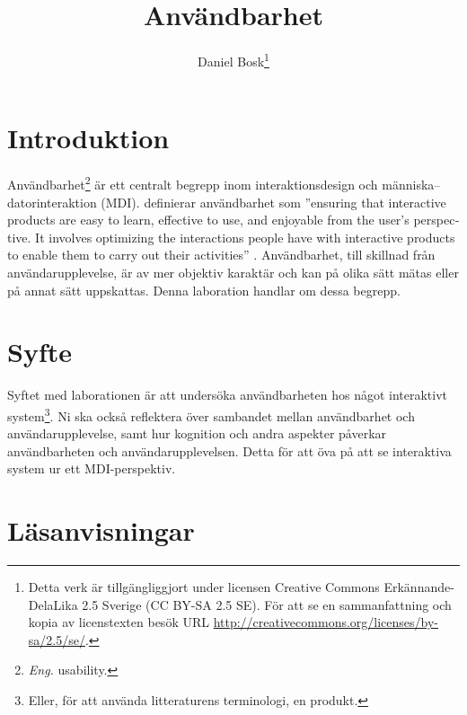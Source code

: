 \documentclass[a4paper,logo,nocourse]{miunasgn}
\title{Användbarhet}
\author{Daniel Bosk\footnote{%
  Detta verk är tillgängliggjort under licensen Creative Commons 
  Erkännande-DelaLika 2.5 Sverige (CC BY-SA 2.5 SE).
  För att se en sammanfattning och kopia av licenstexten besök URL 
  \url{http://creativecommons.org/licenses/by-sa/2.5/se/}.
}}
\date{\svnId}
\begin{document}
\maketitle
\thispagestyle{foot}
\tableofcontents


\section{Introduktion}
\label{sec:Introduktion}
Användbarhet\footnote{%
	\emph{Eng.} usability.
} är ett centralt begrepp inom interaktionsdesign och 
människa--datorinteraktion (MDI).
\citeauthor{Sharp2011idb} definierar användbarhet som
''\foreignlanguage{english}{ensuring that interactive products are easy to 
learn, effective to use, and enjoyable from the user's perspective.
It involves optimizing the interactions people have with interactive products 
to enable them to carry out their activities}'' \citep[sidan 19]{Sharp2011idb}.
Användbarhet, till skillnad från användarupplevelse, är av mer objektiv 
karaktär och kan på olika sätt mätas eller på annat sätt uppskattas.
Denna laboration handlar om dessa begrepp.


\section{Syfte}
\label{sec:Syfte}
Syftet med laborationen är att undersöka användbarheten hos något interaktivt 
system\footnote{%
  Eller, för att använda litteraturens terminologi, en  produkt.
}.
Ni ska också reflektera över sambandet mellan användbarhet och 
användarupplevelse, samt hur kognition och andra aspekter påverkar 
användbarheten och användarupplevelsen.
Detta för att öva på att se interaktiva system ur ett MDI-perspektiv.


\section{Läsanvisningar}
\label{sec:Lasanvisningar}

\end{document}
